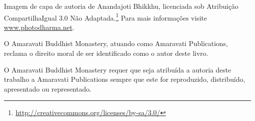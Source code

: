 {Imagem de capa de autoria de Anandajoti Bhikkhu, licenciada sob
Atribuição CompartilhaIgual 3.0 Não Adaptada.\footnote{%
\href{http://creativecommons.org/licenses/by-sa/3.0/}{http://creativecommons.org/licenses/by-sa/3.0/}}
Para mais informações visite \href{http://www.photodharma.net/}{www.photodharma.net}.

O Amaravati Buddhist Monastery, atuando como Amaravati Publications, reclama o
direito moral de ser identificado como o autor deste livro.

O Amaravati Buddhist Monastery requer que seja atribuída a autoria deste
trabalho a Amaravati Publications sempre que este for reproduzido, distribuído,
apresentado ou representado.

}

